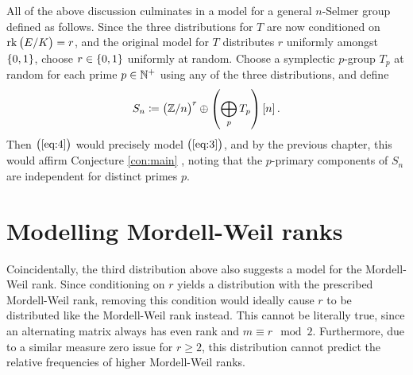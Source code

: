 All of the above discussion culminates in a model for a general $ n $-Selmer group defined as follows. Since the three distributions for $ T $ are now conditioned on $ \rkE = r $, and the original model for $ T $ distributes $ r $ uniformly amongst $ \cbr{0, 1} $, choose $ r \in \cbr{0, 1} $ uniformly at random. Choose a symplectic $ p $-group $ T_p $ at random for each prime $ p \in \mathbb{N}^+ $ using any of the three distributions, and define
\begin{equation}
\label{eq:4}
S_n \coloneqq \br{\ZZ / n}^r \oplus \br{\bigoplus_p T_p}\sbr{n}.
\end{equation}
Then $ \br{\ref{eq:4}} $ would precisely model $ \br{\ref{eq:3}} $, and by the previous chapter, this would affirm Conjecture \ref{con:main} \cite[Section 5.7]{BKLPR15}, noting that the $ p $-primary components of $ S_n $ are independent for distinct primes $ p $.

\section{Modelling Mordell-Weil ranks}

Coincidentally, the third distribution above also suggests a model for the Mordell-Weil rank. Since conditioning on $ r $ yields a distribution with the prescribed Mordell-Weil rank, removing this condition would ideally cause $ r $ to be distributed like the Mordell-Weil rank instead. This cannot be literally true, since an alternating matrix always has even rank and $ m \equiv r \mod 2 $. Furthermore, due to a similar measure zero issue for $ r \ge 2 $, this distribution cannot predict the relative frequencies of higher Mordell-Weil ranks.


